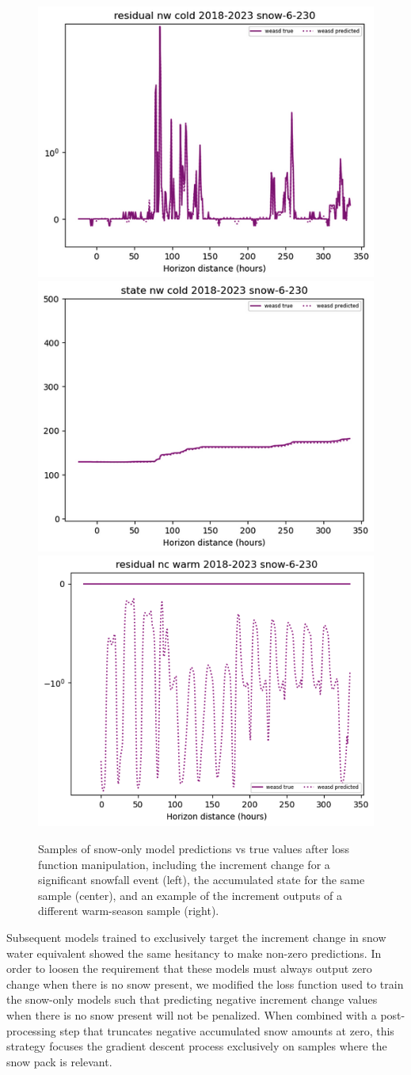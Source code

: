 \begin{figure}[hb!]
    \centering
    \includegraphics[width=.32\linewidth]{figures/snow-sample_res.png}
    \includegraphics[width=.32\linewidth]{figures/snow-sample_state.png}
    \includegraphics[width=.32\linewidth]{figures/snow-sample_warm.png}
    \caption{Samples of snow-only model predictions vs true values after loss function manipulation, including the increment change for a significant snowfall event (left), the accumulated state for the same sample (center), and an example of the increment outputs of a different warm-season sample (right).}
    \label{snow-models}
\end{figure}

Subsequent models trained to exclusively target the increment change in snow water equivalent showed the same hesitancy to make non-zero predictions. In order to loosen the requirement that these models must always output zero change when there is no snow present, we modified the loss function used to train the snow-only models such that predicting negative increment change values when there is no snow present will not be penalized. When combined with a post-processing step that truncates negative accumulated snow amounts at zero, this strategy focuses the gradient descent process exclusively on samples where the snow pack is relevant.

